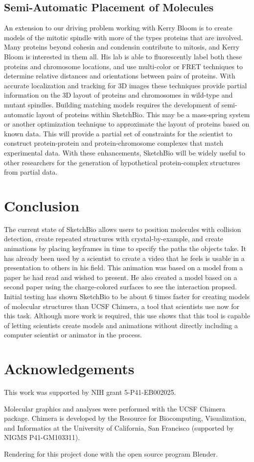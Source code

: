 \documentclass{article} %
\begin{document}
\subsection{Semi-Automatic Placement of Molecules}
An extension to our driving problem working with Kerry Bloom is to create models of the mitotic spindle with more of the types proteins that are involved.  Many proteins beyond cohesin and condensin contribute to mitosis, and Kerry Bloom is interested in them all.  His lab is able to fluorescently label both these proteins and chromosome locations, and use multi-color or FRET techniques to determine relative distances and orientations between pairs of proteins.  With accurate localization and tracking for 3D images these techniques provide partial information on the 3D layout of proteins and chromosomes in wild-type and mutant spindles.  Building matching models requires the development of semi-automatic layout of proteins within SketchBio.  This may be a mass-spring system or another optimization technique to approximate the layout of proteins based on known data.  This will provide a partial set of constraints for the scientist to construct protein-protein and protein-chromosome complexes that match experimental data.  With these enhancements, SketchBio will be widely useful to other researchers for the generation of hypothetical protein-complex structures from partial data.

\section{Conclusion}
The current state of SketchBio allows users to position molecules with collision detection, create repeated structures with crystal-by-example, and create animations by placing keyframes in time to specify the paths the objects take.  It has already been used by a scientist to create a video that he feels is usable in a presentation to others in his field.  This animation was based on a model from a paper he had read and wished to present.  He also created a model based on a second paper using the charge-colored surfaces to see the interaction propsed.  Initial testing has shown SketchBio to be about 6 times faster for creating models of molecular structures than UCSF Chimera, a tool that scientists use now for this task.  Although more work is required, this use shows that this tool is capable of letting scientists create models and animations without directly including a computer scientist or animator in the process.

\section{Acknowledgements}
This work was supported by NIH grant 5-P41-EB002025.

Molecular graphics and analyses were performed with the UCSF Chimera package. Chimera is developed by the Resource for Biocomputing, Visualization, and Informatics at the University of California, San Francisco (supported by NIGMS P41-GM103311).

Rendering for this project done with the open source program Blender\cite{Blender}.



\end{document}

